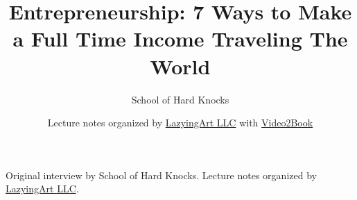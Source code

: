 \documentclass[11pt,oneside]{book}
\begin{document}
\frontmatter
\title{Entrepreneurship: 7 Ways to Make a Full Time Income Traveling The World}
\author{School of Hard Knocks}
\date{Lecture notes organized by \href{https://lazying.art}{LazyingArt LLC} with \href{https://github.com/lachlanchen/Video2Book}{Video2Book}}
\maketitle
\begin{center}
\small Original interview by School of Hard Knocks. Lecture notes organized by \href{https://lazying.art}{LazyingArt LLC}.
\end{center}
\clearpage
\mainmatter

\end{document}
